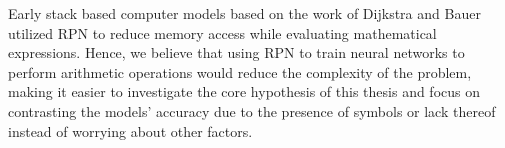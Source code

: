 Early stack based computer models based on the work of Dijkstra and Bauer utilized RPN to reduce memory access while evaluating mathematical expressions\cite{wiki:reverse-polish-notation}. Hence, we believe that using RPN to train neural networks to perform arithmetic operations would reduce the complexity of the problem, making it easier to investigate the core hypothesis of this thesis and focus on contrasting the models' accuracy due to the presence of symbols or lack thereof instead of worrying about other factors.